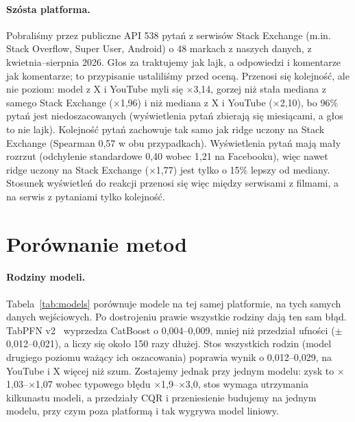 \documentclass[10pt,a4paper]{article}
\newcommand{\x}[1]{$\times$#1}
\begin{document}
\paragraph{Szósta platforma.} Pobraliśmy przez publiczne API 538 pytań z serwisów Stack Exchange (m.in. Stack Overflow,
Super User, Android) o 48 markach z naszych danych, z kwietnia--sierpnia 2026. Głos za traktujemy jak lajk, a odpowiedzi
i komentarze jak komentarze; to przypisanie ustaliliśmy przed oceną. Przenosi się kolejność, ale nie poziom: model
z X i YouTube myli się \x{3,14}, gorzej niż stała mediana z samego Stack Exchange (\x{1,96}) i niż mediana z X i YouTube
(\x{2,10}), bo 96\% pytań jest niedoszacowanych (wyświetlenia pytań zbierają się miesiącami, a głos to nie lajk).
Kolejność pytań zachowuje tak samo jak ridge uczony na Stack Exchange (Spearman 0,57 w obu przypadkach). Wyświetlenia
pytań mają mały rozrzut (odchylenie standardowe 0,40 wobec 1,21 na Facebooku), więc nawet ridge uczony na Stack
Exchange (\x{1,77}) jest tylko o 15\% lepszy od mediany. Stosunek wyświetleń do reakcji przenosi się więc między
serwisami z filmami, a na serwis z pytaniami tylko kolejność.

\section{Porównanie metod}\label{sec:nie}

\paragraph{Rodziny modeli.} Tabela~\ref{tab:models} porównuje modele na tej samej platformie, na tych samych danych
wejściowych. Po dostrojeniu prawie wszystkie rodziny dają ten sam błąd. TabPFN v2~\cite{tabpfn} wyprzedza CatBoost
o 0,004--0,009, mniej niż przedział ufności ($\pm$0,012--0,021), a liczy się około 150 razy dłużej. Stos wszystkich
rodzin (model drugiego poziomu ważący ich oszacowania) poprawia wynik o 0,012--0,029, na YouTube i X więcej niż szum.
Zostajemy jednak przy jednym modelu: zysk to \x{1,03}--\x{1,07} wobec typowego błędu \x{1,9}--\x{3,0}, stos wymaga
utrzymania kilkunastu modeli, a przedziały CQR i przeniesienie budujemy na jednym modelu, przy czym poza platformą
i tak wygrywa model liniowy.
\end{document}
